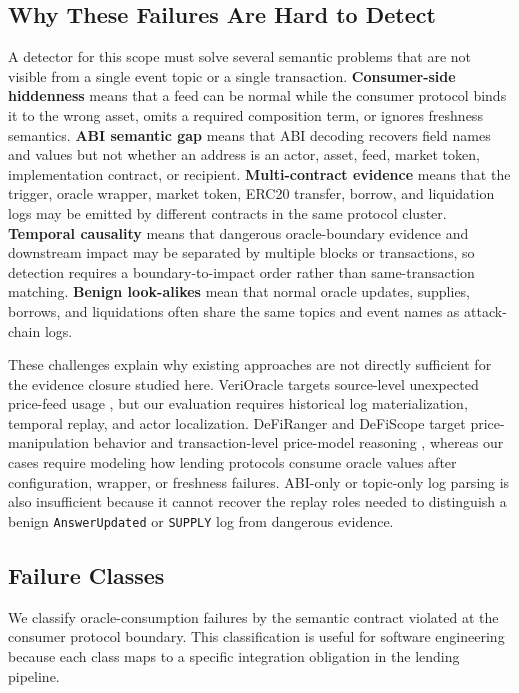 \documentclass[final,5p]{elsarticle}
\newcommand{\code}[1]{\texttt{#1}}
\begin{document}
\subsection{Why These Failures Are Hard to Detect}

A detector for this scope must solve several semantic problems that are not visible from a single event topic or a single transaction.
\textbf{Consumer-side hiddenness} means that a feed can be normal while the consumer protocol binds it to the wrong asset, omits a required composition term, or ignores freshness semantics.
\textbf{ABI semantic gap} means that ABI decoding recovers field names and values but not whether an address is an actor, asset, feed, market token, implementation contract, or recipient.
\textbf{Multi-contract evidence} means that the trigger, oracle wrapper, market token, ERC20 transfer, borrow, and liquidation logs may be emitted by different contracts in the same protocol cluster.
\textbf{Temporal causality} means that dangerous oracle-boundary evidence and downstream impact may be separated by multiple blocks or transactions, so detection requires a boundary-to-impact order rather than same-transaction matching.
\textbf{Benign look-alikes} mean that normal oracle updates, supplies, borrows, and liquidations often share the same topics and event names as attack-chain logs.

These challenges explain why existing approaches are not directly sufficient for the evidence closure studied here.
VeriOracle targets source-level unexpected price-feed usage \cite{mo2023toward}, but our evaluation requires historical log materialization, temporal replay, and actor localization.
DeFiRanger and DeFiScope target price-manipulation behavior and transaction-level price-model reasoning \cite{wu2021defiranger,zhong2025defiscope}, whereas our cases require modeling how lending protocols consume oracle values after configuration, wrapper, or freshness failures.
ABI-only or topic-only log parsing is also insufficient because it cannot recover the replay roles needed to distinguish a benign \code{AnswerUpdated} or \code{SUPPLY} log from dangerous evidence.

\subsection{Failure Classes}

We classify oracle-consumption failures by the semantic contract violated at the consumer protocol boundary.
This classification is useful for software engineering because each class maps to a specific integration obligation in the lending pipeline.
\end{document}
